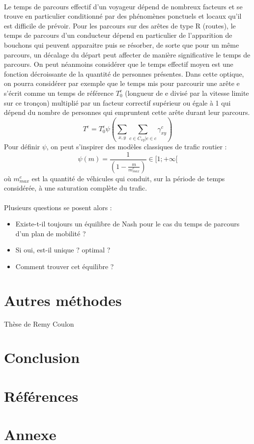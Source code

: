 \documentclass[12pt]{article}
\begin{document}
\\
Le temps de parcours effectif d'un voyageur dépend de nombreux facteurs et se trouve en particulier conditionné par des phénomènes ponctuels et locaux qu'il est difficile de prévoir. Pour les parcours sur des arêtes de type R (routes), le temps de parcours d'un conducteur dépend en particulier de l'apparition de bouchons qui peuvent apparaitre puis se résorber, de sorte que pour un même parcours, un décalage du départ peut affecter de manière significative le temps de parcours. On peut néanmoins considérer que le temps effectif moyen est une fonction décroissante de la quantité de personnes présentes. Dans cette optique, on pourra considérer par exemple que le temps mis pour parcourir une arête e s'écrit comme un temps de référence $T^e_0$ (longueur de e divisé par la vitesse limite sur ce tronçon) multiplié par un facteur correctif supérieur ou égale à 1 qui dépend du nombre de personnes qui empruntent cette arête durant leur parcours.
\[
T^e = T^e_0 \psi(\sum_{x,y} \sum_{c\in C_{xy} | e \in c} \gamma^c_{xy})
\]
Pour définir $\psi$, on peut s'inspirer des modèles classiques de trafic routier :
\[
\psi(m) = \frac{1}{(1 - \frac{m}{m^e_{max}})} \in [1;+\infty[
\] où $m^e_{max}$ est la quantité de véhicules qui conduit, sur la période de temps considérée, à une saturation complète du trafic.\\
\\
Plusieurs questions se posent alors :
\begin{itemize}
    \item Existe-t-il toujours un équilibre de Nash pour le cas du temps de parcours d'un plan de mobilité ?\\
    \item Si oui, est-il unique ? optimal ?\\
    \item Comment trouver cet équilibre ?
\end{itemize}
\section{Autres méthodes}
Thèse de Remy Coulon
\section{Conclusion}
\section{Références}

\section{Annexe}
\end{document}
